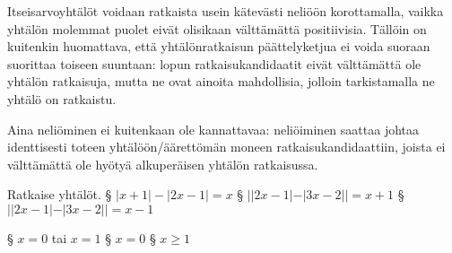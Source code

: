 \begin{tehtavasivu}
\begin{tehtava}
	Itseisarvoyhtälöt voidaan ratkaista usein kätevästi neliöön korottamalla, vaikka yhtälön molemmat puolet eivät olisikaan välttämättä positiivisia. Tällöin on kuitenkin huomattava, että yhtälönratkaisun päättelyketjua ei voida suoraan suorittaa toiseen suuntaan: lopun ratkaisukandidaatit eivät välttämättä ole yhtälön ratkaisuja, mutta ne ovat ainoita mahdollisia, jolloin tarkistamalla ne yhtälö on ratkaistu. 

	Aina neliöminen ei kuitenkaan ole kannattavaa: neliöiminen saattaa johtaa identtisesti toteen yhtälöön/äärettömän moneen ratkaisukandidaattiin, joista ei välttämättä ole hyötyä alkuperäisen yhtälön ratkaisussa.

	Ratkaise yhtälöt.
	\alakohdat
		§ $|x+1|-|2x-1| = x$
		§ $||2x-1|-|3x-2|| = x+1$
		§ $||2x-1|-|3x-2|| = x-1$
	\loppu
	\begin{vastaus}
		\alakohdat
			§ $x = 0$ tai $x = 1$
			§ $x = 0$
			§ $x \geq 1$
		\loppu
	\end{vastaus}
\end{tehtava}

\end{tehtavasivu}
